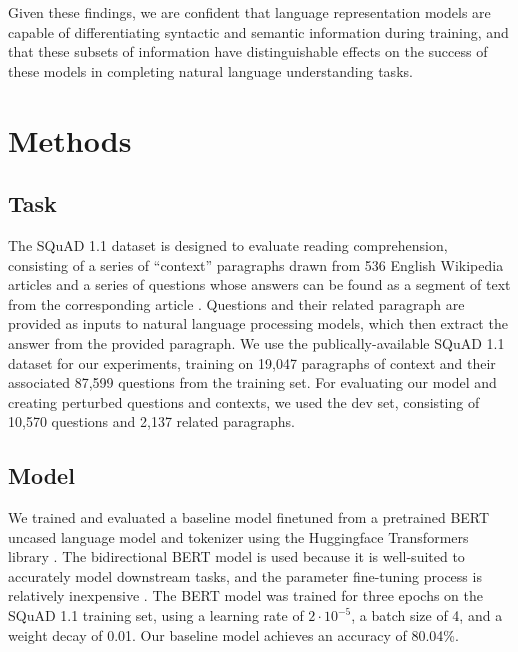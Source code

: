 \documentclass[11pt,a4paper]{article}
\begin{document}
Given these findings, we are confident that language representation models are capable of differentiating syntactic and semantic information during training, and that these subsets of information have distinguishable effects on the success of these models in completing natural language understanding tasks.


\section{Methods}

\subsection{Task}

The SQuAD 1.1 dataset is designed to evaluate reading comprehension, consisting of a series of ``context'' paragraphs drawn from 536 English Wikipedia articles and a series of questions whose answers can be found as a segment of text from the corresponding article \cite{rajpurkar2016squad}. Questions and their related paragraph are provided as inputs to natural language processing models, which then extract the answer from the provided paragraph. We use the publically-available SQuAD 1.1 dataset for our experiments, training on 19,047 paragraphs of context and their associated 87,599 questions from the training set. For evaluating our model and creating perturbed questions and contexts, we used the dev set, consisting of 10,570 questions and 2,137 related paragraphs.

\subsection{Model}

We trained and evaluated a baseline model finetuned from a pretrained BERT uncased language model and tokenizer using the Huggingface Transformers library \cite{wolf-etal-2020-transformers}. The bidirectional BERT model is used because it is well-suited to accurately model downstream tasks, and the parameter fine-tuning process is relatively inexpensive \cite{devlin2019bert}. The BERT model was trained for three epochs on the SQuAD 1.1 training set, using a learning rate of $2\cdot 10^{-5}$, a batch size of 4, and a weight decay of 0.01. Our baseline model achieves an accuracy of 80.04\%.
\end{document}
